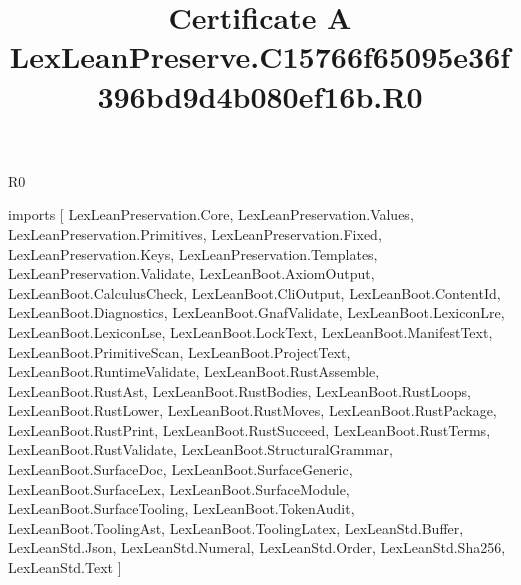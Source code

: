 \begin{lexlean}{R0}
\title{Certificate A LexLeanPreserve.C15766f65095e36f396bd9d4b080ef16b.R0}
\begin{coremodule}
imports [
  LexLeanPreservation.Core,
  LexLeanPreservation.Values,
  LexLeanPreservation.Primitives,
  LexLeanPreservation.Fixed,
  LexLeanPreservation.Keys,
  LexLeanPreservation.Templates,
  LexLeanPreservation.Validate,
  LexLeanBoot.AxiomOutput,
  LexLeanBoot.CalculusCheck,
  LexLeanBoot.CliOutput,
  LexLeanBoot.ContentId,
  LexLeanBoot.Diagnostics,
  LexLeanBoot.GnafValidate,
  LexLeanBoot.LexiconLre,
  LexLeanBoot.LexiconLse,
  LexLeanBoot.LockText,
  LexLeanBoot.ManifestText,
  LexLeanBoot.PrimitiveScan,
  LexLeanBoot.ProjectText,
  LexLeanBoot.RuntimeValidate,
  LexLeanBoot.RustAssemble,
  LexLeanBoot.RustAst,
  LexLeanBoot.RustBodies,
  LexLeanBoot.RustLoops,
  LexLeanBoot.RustLower,
  LexLeanBoot.RustMoves,
  LexLeanBoot.RustPackage,
  LexLeanBoot.RustPrint,
  LexLeanBoot.RustSucceed,
  LexLeanBoot.RustTerms,
  LexLeanBoot.RustValidate,
  LexLeanBoot.StructuralGrammar,
  LexLeanBoot.SurfaceDoc,
  LexLeanBoot.SurfaceGeneric,
  LexLeanBoot.SurfaceLex,
  LexLeanBoot.SurfaceModule,
  LexLeanBoot.SurfaceTooling,
  LexLeanBoot.TokenAudit,
  LexLeanBoot.ToolingAst,
  LexLeanBoot.ToolingLatex,
  LexLeanStd.Buffer,
  LexLeanStd.Json,
  LexLeanStd.Numeral,
  LexLeanStd.Order,
  LexLeanStd.Sha256,
  LexLeanStd.Text
]


\end{coremodule}
\end{lexlean}
